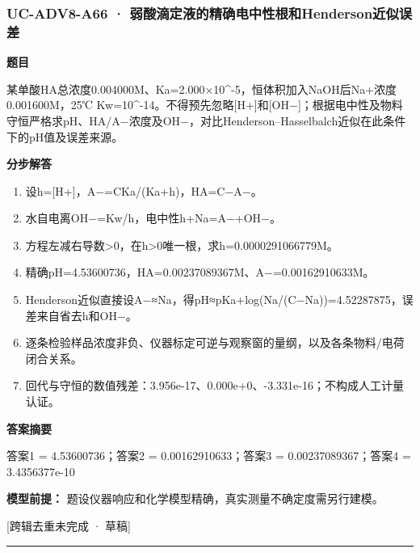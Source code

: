 \documentclass[UTF8,11pt,a4paper]{ctexart}
\begin{document}
\subsubsection*{UC-ADV8-A66 · 弱酸滴定液的精确电中性根和Henderson近似误差}
\noindent\textbf{题目}\par
某单酸HA总浓度0.004000M、Ka=2.000×10\textasciicircum{}-5，恒体积加入NaOH后Na+浓度0.001600M，25℃ Kw=10\textasciicircum{}-14。不得预先忽略[H+]和[OH−]；根据电中性及物料守恒严格求pH、HA/A−浓度及OH−，对比Henderson–Hasselbalch近似在此条件下的pH值及误差来源。\par
\medskip\noindent\textbf{分步解答}
\begin{enumerate}
\item 设h=[H+]，A−=CKa/(Ka+h)，HA=C−A−。
\item 水自电离OH−=Kw/h，电中性h+Na=A−+OH−。
\item 方程左减右导数>0，在h>0唯一根，求h=0.0000291066779M。
\item 精确pH=4.53600736，HA=0.00237089367M、A−=0.00162910633M。
\item Henderson近似直接设A−≈Na，得pH≈pKa+log(Na/(C−Na))=4.52287875，误差来自省去h和OH−。
\item 逐条检验样品浓度非负、仪器标定可逆与观察窗的量纲，以及各条物料/电荷闭合关系。
\item 回代与守恒的数值残差：3.956e-17、0.000e+0、-3.331e-16；不构成人工计量认证。
\end{enumerate}
\noindent\textbf{答案摘要}\par
答案1 = 4.53600736；答案2 = 0.00162910633；答案3 = 0.00237089367；答案4 = 3.4356377e-10\par
\noindent\textbf{模型前提：}
题设仪器响应和化学模型精确，真实测量不确定度需另行建模。\par
\noindent\textcolor{red!65!black}{[跨辑去重未完成 · 草稿]} \par
\medskip\hrule\medskip
{}
\end{document}
